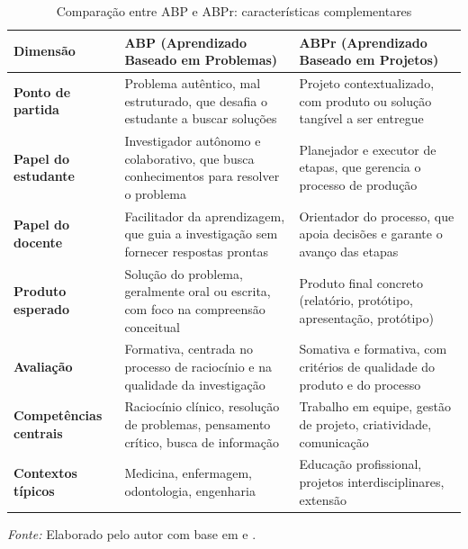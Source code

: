 \begin{table}[htbp]
    \centering
    \caption{Comparação entre ABP e ABPr: características complementares}
    \label{tab:comparacao_abp_abpr}
    \small
    \begin{tabular}{p{2.8cm} p{5.5cm} p{5.5cm}}
        \toprule
        \textbf{Dimensão} & \textbf{ABP (Aprendizado Baseado em Problemas)} & \textbf{ABPr (Aprendizado Baseado em Projetos)} \\
        \midrule
        \textbf{Ponto de partida} & Problema autêntico, mal estruturado, que desafia o estudante a buscar soluções & Projeto contextualizado, com produto ou solução tangível a ser entregue \\
        \addlinespace
        \textbf{Papel do estudante} & Investigador autônomo e colaborativo, que busca conhecimentos para resolver o problema & Planejador e executor de etapas, que gerencia o processo de produção \\
        \addlinespace
        \textbf{Papel do docente} & Facilitador da aprendizagem, que guia a investigação sem fornecer respostas prontas & Orientador do processo, que apoia decisões e garante o avanço das etapas \\
        \addlinespace
        \textbf{Produto esperado} & Solução do problema, geralmente oral ou escrita, com foco na compreensão conceitual & Produto final concreto (relatório, protótipo, apresentação, protótipo) \\
        \addlinespace
        \textbf{Avaliação} & Formativa, centrada no processo de raciocínio e na qualidade da investigação & Somativa e formativa, com critérios de qualidade do produto e do processo \\
        \addlinespace
        \textbf{Competências centrais} & Raciocínio clínico, resolução de problemas, pensamento crítico, busca de informação & Trabalho em equipe, gestão de projeto, criatividade, comunicação \\
        \addlinespace
        \textbf{Contextos típicos} & Medicina, enfermagem, odontologia, engenharia & Educação profissional, projetos interdisciplinares, extensão \\
        \bottomrule
    \end{tabular}
    \par\medskip
    \footnotesize{\textit{Fonte:} Elaborado pelo autor com base em \cite{BARROWS1996} e \cite{BARRON1998}.}
    \vspace{2pt}

\end{table}
